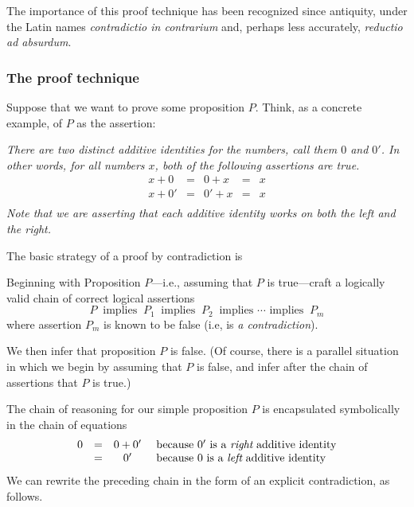 The importance of this proof technique has been recognized since
antiquity, under the Latin names {\em contradictio in contrarium} and,
perhaps less accurately, {\em reductio ad absurdum}.

\subsubsection{The proof technique}
\label{sec:contradiction-technique}

Suppose that we want to prove some proposition $P$.  Think, as a
concrete example, of $P$ as the assertion:

{\em There are two distinct {\em additive identities} for the
  numbers, call them $0$ and $0'$.  In other words, for all numbers
  $x$, both of the following assertions are true.}
\[ \begin{array}{ccccc}
x + 0 & = & 0 + x & = & x \\
x + 0' & = & 0' + x & = & x \\
\end{array}
\]
{\em Note that we are asserting that each additive identity works on
  both the left and the right.}

\noindent
The basic strategy of a proof by contradiction is

Beginning with Proposition $P$---i.e., assuming that $P$ is
true---craft a logically valid chain of correct logical assertions
\[ P \ \mbox{ implies } \ P_1  \ \mbox{ implies } \ P_2  \ 
\mbox{ implies } \cdots \mbox{ implies } \ P_m
\]
where assertion $P_m$ is known to be false (i.e, is {\it a
  contradiction}).

\noindent
We then infer that proposition $P$ is false.  (Of course, there is a
parallel situation in which we begin by assuming that $P$ is false,
and infer after the chain of assertions that $P$ is true.)

The chain of reasoning for our simple proposition $P$ is encapsulated
symbolically in the chain of equations
\[
\begin{array}{cccl}
 0 & = & 0 + 0' & \mbox{ because $0'$ is a {\em right}
   additive identity} \\
   & = & 0' & \mbox{ because $0$ is a {\em left}
   additive identity}
\end{array}
\]
We can rewrite the preceding chain in the form of an explicit
contradiction, as follows.

